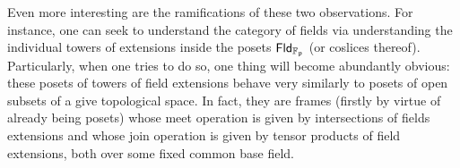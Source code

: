\begin{example}
\begin{enumerate}
\begin{enumerate}
                                \end{enumerate}
                            Even more interesting are the ramifications of these two observations. For instance, one can seek to understand the category of fields via understanding the individual towers of extensions inside the posets $\mathsf{Fld}_{\mathbb{F}_{\mathfrak{p}}}$ (or coslices thereof). Particularly, when one tries to do so, one thing will become abundantly obvious: these posets of towers of field extensions behave very similarly to posets of open subsets of a give topological space. In fact, they are frames (firstly by virtue of already being posets) whose meet operation is given by intersections of fields extensions and whose join operation is given by tensor products of field extensions, both over some fixed common base field. 
                                

\end{enumerate}
\end{example}
